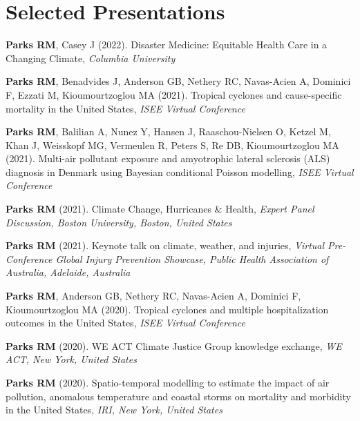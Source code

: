 \section*{Selected Presentations}


\noindent \textbf{Parks RM}, Casey J (2022). Disaster Medicine: Equitable Health Care in a Changing Climate, \textit{Columbia University} \medskip

\noindent \textbf{Parks RM}, Benadvides J, Anderson GB, Nethery RC, Navas-Acien A, Dominici F, Ezzati M, Kioumourtzoglou MA (2021). Tropical cyclones and cause-specific mortality in the United States, \textit{ISEE Virtual Conference} \medskip

\noindent \textbf{Parks RM}, Balilian A, Nunez Y, Hansen J, Raaschou-Nielsen O, Ketzel M, Khan J, Weisskopf MG, Vermeulen R, Peters S, Re DB, Kioumourtzoglou MA (2021). Multi-air pollutant exposure and amyotrophic lateral sclerosis (ALS) diagnosis in Denmark using Bayesian conditional Poisson modelling, \textit{ISEE Virtual Conference} \medskip

\noindent \textbf{Parks RM} (2021). Climate Change, Hurricanes \& Health,  \textit{Expert Panel Discussion, Boston University, Boston, United States} \medskip

\noindent \textbf{Parks RM} (2021). Keynote talk on climate, weather, and injuries,  \textit{Virtual Pre-Conference Global Injury Prevention Showcase, Public Health Association of Australia, Adelaide, Australia} \medskip


\noindent \textbf{Parks RM}, Anderson GB, Nethery RC, Navas-Acien A, Dominici F, Kioumourtzoglou MA (2020). Tropical cyclones and multiple hospitalization outcomes in the United States, \textit{ISEE Virtual Conference} \medskip

\noindent \textbf{Parks RM} (2020). WE ACT Climate Justice Group knowledge exchange, \textit{WE ACT, New York, United States} \medskip

\noindent \textbf{Parks RM} (2020). Spatio-temporal modelling to estimate the impact of air pollution, anomalous temperature and coastal storms on mortality and morbidity in the United States,  \textit{IRI, New York, United States} \medskip

